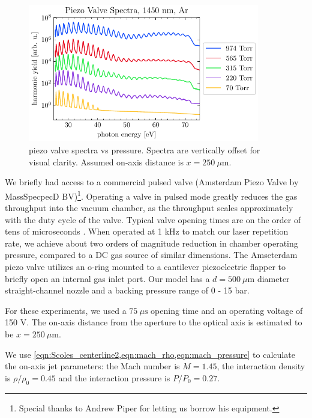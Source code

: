 \begin{figure}
	\centering
	\includegraphics[width=0.9\textwidth]{figures/chap3/piezovalve_spectra.pdf}
	\caption{piezo valve spectra vs pressure. Spectra are vertically offset for visual clarity. Assumed on-axis distance is $x = 250 \ \mu \textrm{m}$.}
	\label{fig:piezovalve_spectra}
\end{figure}

We briefly had access to a commercial pulsed valve (Amsterdam Piezo Valve by MassSpecpecD BV)\footnote{Special thanks to Andrew Piper for letting us borrow his equipment.}. Operating a valve in pulsed mode greatly reduces the gas throughput into the vacuum chamber, as the throughput scales approximately with the duty cycle of the valve. Typical valve opening times are on the order of tens of microseconds \cite{irimiaSituCharacterizationCold2009,mengMeasurementDensityProfile2015,irimiaShortPulseMicrosecond2009}. When operated at 1 kHz to match our laser repetition rate, we achieve about two orders of magnitude reduction in chamber operating pressure, compared to a DC gas source of similar dimensions. The Amseterdam piezo valve utilizes an o-ring mounted to a cantilever piezoelectric flapper to briefly open an internal gas inlet port. Our model has a $d = 500 \ \mu \textrm{m}$ diameter straight-channel nozzle and a backing pressure range of 0 - 15 bar.

For these experiments, we used a $75 \ \mu \textrm{s}$ opening time and an operating voltage of 150 V. The on-axis distance from the aperture to the optical axis is estimated to be $x = 250 \ \mu \textrm{m}$.

We use \cref{eqn:Scoles_centerline2,eqn:mach_rho,eqn:mach_pressure} to calculate the on-axis jet parameters: the Mach number is $M=1.45$, the interaction density is $\rho/\rho_0 = 0.45$ and the interaction pressure is $P/P_0 = 0.27$.

